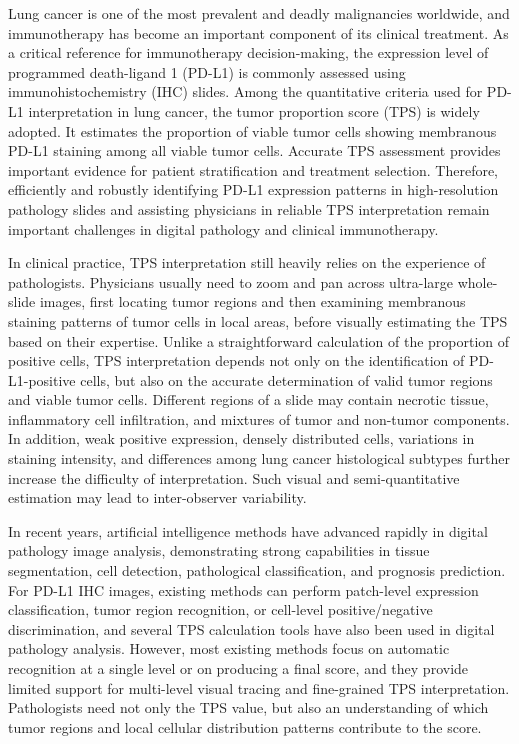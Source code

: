 \documentclass[journal]{vgtc}                     %
\begin{document}
Lung cancer is one of the most prevalent and deadly malignancies worldwide, and immunotherapy has become an important component of its clinical treatment. As a critical reference for immunotherapy decision-making, the expression level of programmed death-ligand 1 (PD-L1) is commonly assessed using immunohistochemistry (IHC) slides. Among the quantitative criteria used for PD-L1 interpretation in lung cancer, the tumor proportion score (TPS) is widely adopted. It estimates the proportion of viable tumor cells showing membranous PD-L1 staining among all viable tumor cells\cite{herbst2014predictive}. Accurate TPS assessment provides important evidence for patient stratification and treatment selection. Therefore, efficiently and robustly identifying PD-L1 expression patterns in high-resolution pathology slides and assisting physicians in reliable TPS interpretation remain important challenges in digital pathology and clinical immunotherapy.

In clinical practice, TPS interpretation still heavily relies on the experience of pathologists. Physicians usually need to zoom and pan across ultra-large whole-slide images, first locating tumor regions and then examining membranous staining patterns of tumor cells in local areas, before visually estimating the TPS based on their expertise. Unlike a straightforward calculation of the proportion of positive cells, TPS interpretation depends not only on the identification of PD-L1-positive cells, but also on the accurate determination of valid tumor regions and viable tumor cells. Different regions of a slide may contain necrotic tissue, inflammatory cell infiltration, and mixtures of tumor and non-tumor components. In addition, weak positive expression, densely distributed cells, variations in staining intensity, and differences among lung cancer histological subtypes further increase the difficulty of interpretation. Such visual and semi-quantitative estimation may lead to inter-observer variability.

In recent years, artificial intelligence methods have advanced rapidly in digital pathology image analysis, demonstrating strong capabilities in tissue segmentation, cell detection, pathological classification, and prognosis prediction\cite{zhang2024efficient,chen2024towards}. For PD-L1 IHC images, existing methods can perform patch-level expression classification, tumor region recognition, or cell-level positive/negative discrimination\cite{mclaughlin2016quantitative,liu2021automated}, and several TPS calculation tools have also been used in digital pathology analysis\cite{huang2022new}. However, most existing methods focus on automatic recognition at a single level or on producing a final score, and they provide limited support for multi-level visual tracing and fine-grained TPS interpretation. Pathologists need not only the TPS value, but also an understanding of which tumor regions and local cellular distribution patterns contribute to the score.
\end{document}
